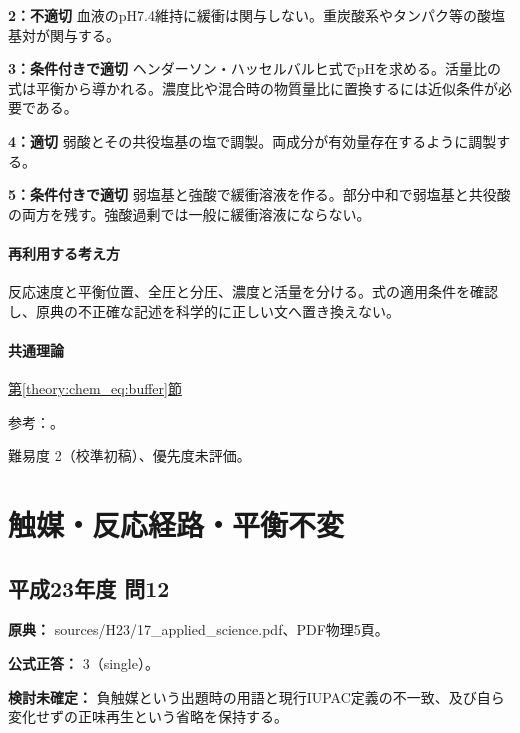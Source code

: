\noindent\textbf{2：不適切} 血液のpH7.4維持に緩衝は関与しない。重炭酸系やタンパク等の酸塩基対が関与する。\par

\noindent\textbf{3：条件付きで適切} ヘンダーソン・ハッセルバルヒ式でpHを求める。活量比の式は平衡から導かれる。濃度比や混合時の物質量比に置換するには近似条件が必要である。\par

\noindent\textbf{4：適切} 弱酸とその共役塩基の塩で調製。両成分が有効量存在するように調製する。\par

\noindent\textbf{5：条件付きで適切} 弱塩基と強酸で緩衝溶液を作る。部分中和で弱塩基と共役酸の両方を残す。強酸過剰では一般に緩衝溶液にならない。\par

\paragraph{再利用する考え方} 反応速度と平衡位置、全圧と分圧、濃度と活量を分ける。式の適用条件を確認し、原典の不正確な記述を科学的に正しい文へ置き換えない。

\paragraph{共通理論} \hyperref[theory:chem_eq:buffer]{第\ref*{theory:chem_eq:buffer}節}

\par 参考：\cite{iupac_greenbook2012,mit_buffer2008}。

\par 難易度 2（校準初稿）、優先度未評価。

\section{触媒・反応経路・平衡不変}

\subsection{平成23年度 問12}
\label{q:h23-reg-applied-12}

\noindent\textbf{原典：} sources/H23/17\_applied\_science.pdf、PDF物理5頁。

\textbf{公式正答：} 3（single）。

\par\textbf{検討未確定：} 負触媒という出題時の用語と現行IUPAC定義の不一致、及び自ら変化せずの正味再生という省略を保持する。

